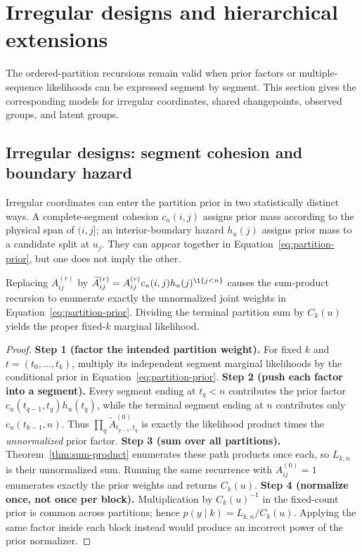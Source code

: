 \section{Irregular designs and hierarchical extensions}
\label{sec:extensions}

The ordered-partition recursions remain valid when prior factors or multiple-sequence likelihoods can be expressed segment by segment. This section gives the corresponding models for irregular coordinates, shared changepoints, observed groups, and latent groups.

\subsection{Irregular designs: segment cohesion and boundary hazard}
Irregular coordinates can enter the partition prior in two statistically distinct ways. A complete-segment cohesion $c_u(i,j)$ assigns prior mass according to the physical span of $(i,j]$; an interior-boundary hazard $h_u(j)$ assigns prior mass to a candidate split at $u_j$. They can appear together in Equation~\eqref{eq:partition-prior}, but one does not imply the other.



\begin{theorem}
\label{thm:local-prior-paper}
Replacing $A^{(r)}_{ij}$ by
$\widetilde A^{(r)}_{ij}=A^{(r)}_{ij}c_u(i,j)h_u(j)^{\1\{j<n\}}$
causes the sum-product recursion to enumerate exactly the unnormalized joint weights in Equation~\eqref{eq:partition-prior}. Dividing the terminal partition sum by $C_k(u)$ yields the proper fixed-$k$ marginal likelihood.
\end{theorem}
\begin{proof}
\textbf{Step 1 (factor the intended partition weight).}
For fixed $k$ and $t=(t_0,\ldots,t_k)$, multiply its independent segment marginal likelihoods by the conditional prior in Equation~\eqref{eq:partition-prior}.
\textbf{Step 2 (push each factor into a segment).}
Every segment ending at $t_q<n$ contributes the prior factor $c_u(t_{q-1},t_q)h_u(t_q)$, while the terminal segment ending at $n$ contributes only $c_u(t_{k-1},n)$. Thus $\prod_q\widetilde A^{(0)}_{t_{q-1},t_q}$ is exactly the likelihood product times the \emph{unnormalized} prior factor.
\textbf{Step 3 (sum over all partitions).}
Theorem~\ref{thm:sum-product} enumerates these path products once each, so $L_{k,n}$ is their unnormalized sum. Running the same recurrence with $A^{(0)}_{ij}=1$ enumerates exactly the prior weights and returns $C_k(u)$.
\textbf{Step 4 (normalize once, not once per block).}
Multiplication by $C_k(u)^{-1}$ in the fixed-count prior is common across partitions; hence $p(y\mid k)=L_{k,n}/C_k(u)$. Applying the same factor inside each block instead would produce an incorrect power of the prior normalizer.
\end{proof}

